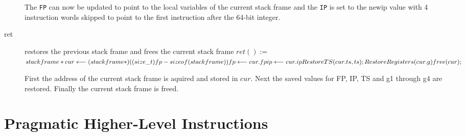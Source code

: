 \documentclass[english,a4paper]{report}
\begin{document}
\begin{description}
	The \verb|FP| can now be updated to point to the local variables 
	of
	the current stack frame and the \verb|IP| is set to the newip 
	value
	with 4 instruction words skipped to point to the first instruction
	after the 64-bit integer.
	
	\item[ret] restores the previous stack frame and frees the current
	stack frame
	$ret() := $  \\
	$ stackframe *cur \longleftarrow (stackframe*)((size\_t)fp - 
	sizeof(stackframe)) \\
	fp \longleftarrow cur.fp \\
	ip \longleftarrow cur.ip \\
	RestoreTS(cur.ts, ts);\\
	RestoreRegisters(cur.g) \\
	free(cur); \\$
	
	First the address of the current stack frame is aquired and stored
	in $cur$.
	Next the saved values for FP, IP, TS and g1 through g4 are 
	restored.
	Finally the current stack frame is freed.
\end{description}

\section{Pragmatic Higher-Level Instructions}
\end{document}
